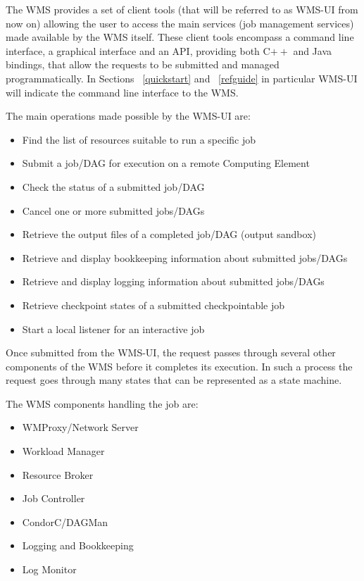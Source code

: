 
The WMS provides a set of client tools (that will be referred to as WMS-UI from now on) allowing the 
user to access the main services (job management services) made available by the WMS itself. 
These client tools encompass a command line interface, a graphical interface and an API, providing both C$++$ 
and Java bindings, that allow the requests to be submitted and managed programmatically.
In Sections ~\ref{quickstart} and ~\ref{refguide} in particular WMS-UI will indicate the command line interface to the WMS. 

The main operations made possible by the WMS-UI are:
\begin{itemize}
\item Find the list of resources suitable to run a specific job
\item Submit a job/DAG for execution on a remote Computing Element
\item Check the status of a submitted job/DAG	
\item Cancel one or more submitted jobs/DAGs
\item Retrieve the output files of a completed job/DAG (output sandbox)
\item Retrieve and display bookkeeping information about submitted jobs/DAGs
\item Retrieve and display logging information about submitted jobs/DAGs
\item Retrieve checkpoint states of a submitted checkpointable job
\item Start a local listener for an interactive job
\end {itemize}
 
Once submitted from the WMS-UI, the request passes through several other components of the WMS before it 
completes its execution. In such a process the request goes through many states that can be represented 
as a state machine.

The WMS components handling the job are:

\begin{itemize}
\item WMProxy/Network Server 
\item Workload Manager 
\item Resource Broker
\item Job Controller 
\item CondorC/DAGMan
\item Logging and Bookkeeping 
\item Log Monitor 
\end{itemize}


